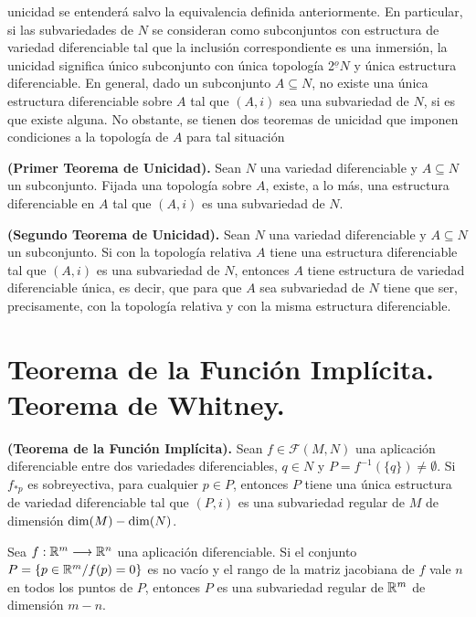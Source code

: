 \documentclass[Cursovd_portada.tex]{subfiles}
\begin{document}
unicidad se entenderá salvo la equivalencia definida
anteriormente. En particular, si las subvariedades de $N$ se
consideran como subconjuntos con estructura de variedad
diferenciable tal que la inclusión correspondiente es una
inmersión, la unicidad significa único subconjunto con
única topología 2$^{\underline{o}}N$ y única
estructura diferenciable. En general, dado un subconjunto
$A\subseteq N$, no existe una única estructura diferenciable
sobre $A$ tal que $(A,i)$ sea una subvariedad de $N$, si es que
existe alguna. No obstante, se tienen dos teoremas de unicidad que
imponen condiciones a la topología de $A$ para tal
situación
\begin{teorema}
{\bf (Primer Teorema de Unicidad).} Sean $N$ una variedad
diferenciable y $A\subseteq N$ un subconjunto. Fijada una
topología sobre $A$, existe, a lo más, una estructura
diferenciable en $A$ tal que $(A,i)$ es una subvariedad de $N$.
\end{teorema}
\begin{teorema}
{\bf (Segundo Teorema de Unicidad).} Sean $N$ una variedad
diferenciable y $A\subseteq N$ un subconjunto. Si con la
topología relativa $A$ tiene una estructura diferenciable tal
que $(A,i)$ es una subvariedad de $N$, entonces $A$ tiene
estructura de variedad diferenciable única, es decir, que para
que $A$ sea subvariedad de $N$ tiene que ser, precisamente, con la
topología relativa y con la misma estructura diferenciable.
\end{teorema}
\section{Teorema de la Función Implícita. Teorema de Whitney.}
\begin{teorema}
{\bf (Teorema de la Función Implícita).} Sean
$f\in\mathcal{F}(M,N)$ una aplicación diferenciable entre dos
variedades diferenciables, $q\in N$ y
$P=f^{-1}(\{q\})\neq\emptyset$. Si $f_{*p}$ es sobreyectiva, para
cualquier $p\in P$, entonces $P$ tiene una única estructura de
variedad diferenciable tal que $(P,i)$ es una subvariedad regular
de $M$ de dimensión ${\rm dim}(M)-{\rm dim}(N)$.
\end{teorema}
\begin{coro} Sea $f:\mathbb{R}^m\longrightarrow\mathbb{R}^n$ una aplicación
diferenciable. Si el conjunto $P=\{p\in\mathbb{R}^m/f(p)=0\}$ es no
vacío y el rango de la matriz jacobiana de $f$ vale $n$ en
todos los puntos de $P$, entonces $P$ es una subvariedad regular
de $\mathbb{R}^m$ de dimensión $m-n$.
\end{coro}
\end{document}
